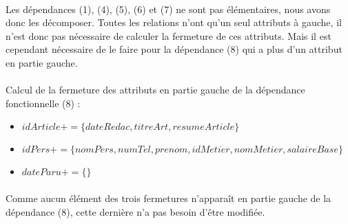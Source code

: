 \paragraph{}{
    Les dépendances (1), (4), (5), (6) et (7) ne sont pas élémentaires, nous avons donc les décomposer. Toutes les relations n'ont qu'un seul attributs à gauche, il n'est donc pas nécessaire de calculer la fermeture de ces attributs. Mais il est cependant nécessaire de le faire pour la dépendance (8) qui a plus d'un attribut en partie gauche.
    }

\paragraph{}{
    Calcul de la fermeture des attributs en partie gauche de la dépendance fonctionnelle (8) :
}
\begin{itemize}
    \item $idArticle+ = \{dateRedac, titreArt, resumeArticle\}$
    \item $idPers+ = \{nomPers, numTel, prenom, idMetier, nomMetier, salaireBase\}$
    \item $dateParu+ = \{\}$
\end{itemize}

\paragraph{}{Comme aucun élément des trois fermetures n'apparaît en partie gauche de la dépendance (8), cette dernière n'a pas besoin d'être modifiée.}
